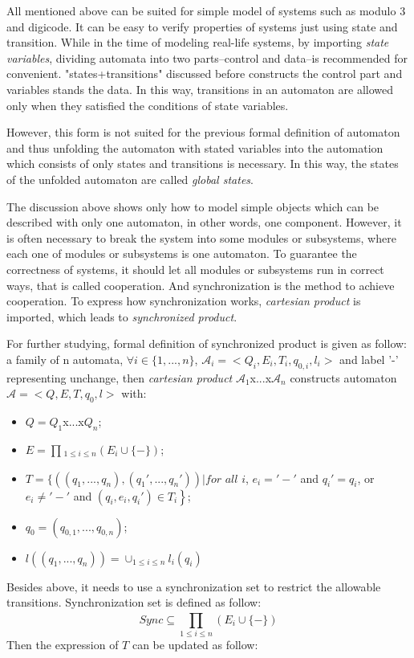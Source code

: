 \documentclass[11pt, conference]{IEEEtran}
\begin{document}
    All mentioned above can be suited for simple model of systems such as modulo 3 and digicode. It can be easy to verify properties of systems just using state and transition. While in the time of modeling real-life systems, by importing {\itshape state variables}, dividing automata into two parts--control and data--is recommended for convenient. "states+transitions" discussed before constructs the control part and variables stands the data. In this way, transitions in an automaton are allowed only when they satisfied the conditions of state variables.

    However, this form is not suited for the previous formal definition of automaton and thus unfolding the automaton with stated variables into the automation which consists of only states and transitions is necessary. In this way, the states of the unfolded automaton  are called {\itshape global states}.

    The discussion above shows only how to model simple objects which can be described with only one automaton, in other words, one component. However, it is often necessary to break the system into some modules or subsystems, where each one of  modules or subsystems is one automaton. To guarantee the correctness of systems, it should let all modules or subsystems run in correct ways, that is called cooperation. And synchronization is the method to achieve cooperation. To express how synchronization works, {\itshape cartesian product} is imported, which leads to {\itshape synchronized product}.

    For further studying, formal definition of synchronized product is given as follow: a family of n automata, $\forall{i} \in \{1,...,n\}$, $\mathcal{A}_i=<Q_i, E_i,T_i,q_{0,i},l_i>$ and label '-' representing unchange, then {\itshape cartesian product} $\mathcal{A}_1$x...x$\mathcal{A}_n$ constructs automaton $\mathcal{A} =<Q,E,T,q_0,l>$ with:
     \begin{itemize}
      \item $Q=Q_1$x...x$Q_n$;
      \item $E=\prod_{}{}_{1\leq i \leq n}(E_i\cup\{-\})$;
      \item $T=\left.\{ ((q_1,...,q_n),(q_1',...,q_n')) |  for\right.$ $all$ $i$, $e_i='-'$ and $q_i'=q_i$, or $e_i\neq '-'$ and $(q_i,e_i,q_i')\in T_i \left.\right\} $;
      \item $q_0=(q_{0,1},...,q_{0,n})$;
      \item $l((q_1,...,q_n))=\cup _{1\leq i \leq n}l_i(q_i)$
    \end{itemize}
    Besides above, it needs to use a synchronization set to restrict the allowable transitions. Synchronization set is defined as follow:
    \begin{equation*}
      Sync \subseteq \prod_{1\leq i \leq n}^{}(E_i\cup\{-\})
    \end{equation*}
    Then the expression of $T$ can be updated as follow:
    
\end{document}
